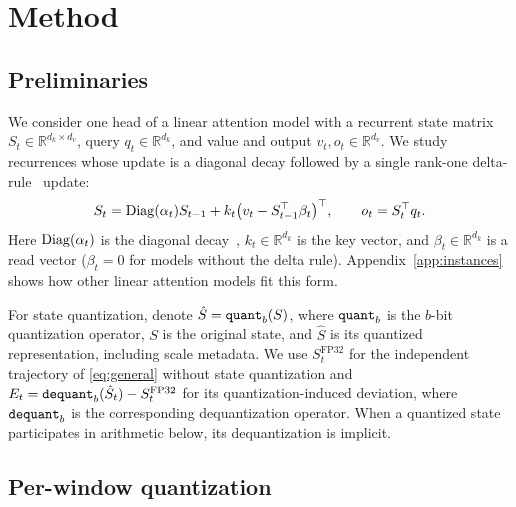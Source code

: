 \section{Method}
\label{sec:method}

\vspace{-0.5em}
\subsection{Preliminaries}
\label{sec:prelim}

We consider one head of a linear attention model with a recurrent state matrix $S_t\in\mathbb{R}^{d_k\times d_v}$, query $q_t\in\mathbb{R}^{d_k}$, and value and output $v_t,o_t\in\mathbb{R}^{d_v}$.
We study recurrences whose update is a diagonal decay followed by a single rank-one delta-rule~\citep{schlag2021linear} update:
\begin{equation}
  S_t = \operatorname{Diag}(\alpha_t)S_{t-1}
      + k_t\bigl(v_t-S_{t-1}^{\top}\beta_t\bigr)^{\top},
  \qquad o_t=S_t^{\top}q_t.
  \label{eq:general}
\end{equation}
Here $\operatorname{Diag}(\alpha_t)$ is the diagonal decay~\citep{team2025kimi}, $k_t\in\mathbb{R}^{d_k}$ is the key vector, and $\beta_t\in\mathbb{R}^{d_k}$ is a read vector ($\beta_t=0$ for models without the delta rule).
Appendix~\ref{app:instances} shows how other linear attention models fit this form.

For state quantization, denote $\hat S=\operatorname{\mathtt{quant}}_b(S)$, where $\operatorname{\mathtt{quant}}_b$ is the $b$-bit quantization operator, $S$ is the original state, and $\hat S$ is its quantized representation, including scale metadata.
We use $S_t^{\mathrm{FP32}}$ for the independent trajectory of \eqref{eq:general} without state quantization and $E_t=\operatorname{\mathtt{dequant}}_b(\hat S_t)-S_t^{\mathrm{FP32}}$ for its quantization-induced deviation, where $\operatorname{\mathtt{dequant}}_b$ is the corresponding dequantization operator.
When a quantized state participates in arithmetic below, its dequantization is implicit.

\subsection{Per-window quantization}
\label{sec:round1}

